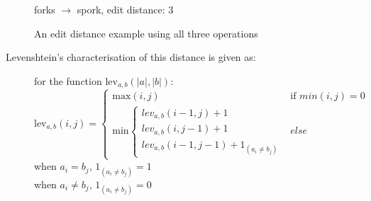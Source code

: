 \documentclass[a4paper,11pt,twoside,notitlepage]{article}
\newcommand\CellText[2]{%
          \node[texto,left=of mat#1,anchor=east]
          at (mat#1.west)
          {\large #2};
        }
\newcommand\SlText[2]{%
          \node[texto,left=of mat#1,anchor=west,rotate=50]
          at ([xshift=1.5ex,yshift=1ex]mat#1.north)
          {\large #2};
        }
\begin{document}
        \begin{figure}[h]
          \centering
                  

          \vspace{3 mm}

          forks $\rightarrow$ spork, edit distance: 3
          
          \caption{An edit distance example using all three operations}
          \label{fig:fork-spork}
        \end{figure}

        Levenshtein's characterisation of this distance is given as:
        
        \begin{figure}[h!]
          \centering
          for the function $\mbox{lev}_{a,b}(|a|,|b|)$:\\
          $$\mbox{lev}_{a,b}(i,j) = 
             \left\{
                \begin{array}{ll}
                  \mbox{max}(i,j) & \mbox{if }min(i,j) = 0\\
                  \mbox{min}\left\{
                        \begin{array}{lll}
                          lev_{a,b}(i-1,j)+1\\
                          lev_{a,b}(i,j-1)+1\\
                          lev_{a,b}(i-1,j-1)+1_{(a_i{\neq}b_j)}
                        \end{array}
                      \right.
	                & else 
	        \end{array}
             \right.$$
             when $a_i = b_j$, $1_{(a_i{\neq}b_j)} = 1$\\
             when  $a_i \neq b_j$, $1_{(a_i{\neq}b_j)} = 0$
        \end{figure}
\end{document}
